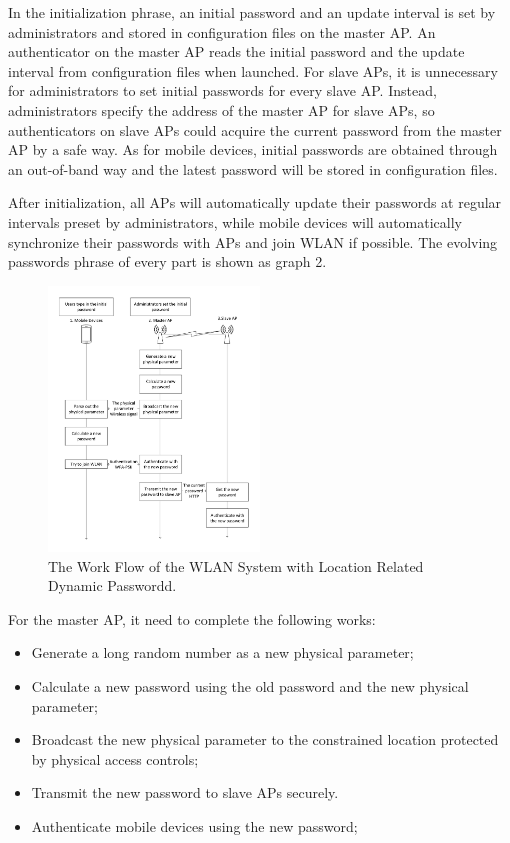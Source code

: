 In the initialization phrase, an initial password and an update interval is set by administrators and stored in configuration files on the master AP. An authenticator on the master AP reads the initial password and the update interval from configuration files when launched. For slave APs, it is unnecessary for administrators to set initial passwords for every slave AP. Instead, administrators specify the address of the master AP for slave APs, so authenticators on slave APs could acquire the current password from the master AP by a safe way. As for mobile devices,  initial passwords are obtained through an out-of-band way and the latest password will be stored in configuration files. 

After initialization, all APs will automatically update their passwords at regular intervals preset by administrators, while mobile devices will automatically synchronize their passwords with APs and join WLAN if possible. The evolving passwords phrase of every part is shown as graph 2. 

\begin{figure}
    \centering
    \includegraphics[width=0.5\textwidth]{pic/2.pdf}
    \caption{The Work Flow of the WLAN System with Location Related Dynamic Passwordd.}
    \label{fig:xxx}
\end{figure}


For the master AP, it need to complete the following works: 
\begin{itemize}
    \item Generate a long random number as a new physical parameter; 
    \item Calculate a new password using the old password and the new physical parameter; 
    \item Broadcast the new physical parameter to the constrained location protected by physical access controls; 
    \item Transmit the new password to slave APs securely. 
    \item Authenticate mobile devices using the new password; 
\end{itemize}
	

